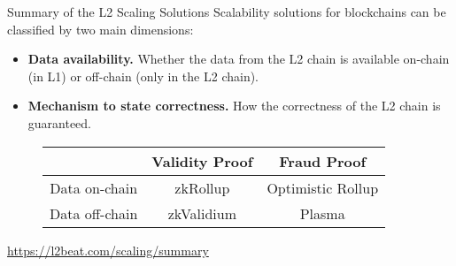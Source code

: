 \begin{frame}[t]{Summary of the L2 Scaling Solutions}
Scalability solutions for blockchains can be classified by two main dimensions:
  \begin{itemize}
  \item \textbf{Data availability.} Whether the data from the L2 chain is available on-chain (in L1) or off-chain (only in the L2 chain).
  \item \textbf{Mechanism to state correctness.} How the correctness of the L2 chain is guaranteed.
  \end{itemize}

\vspace{0.35cm}
\begin{figure}
\begin{tabular}{|c|c|c|}
\hline
\cellcolor{darkgray} & \cellcolor{darkgray} \color{white} Validity Proof  & \cellcolor{darkgray} \color{white} Fraud Proof \\ \hline
\cellcolor{lightgray} Data on-chain   & zkRollup       & Optimistic Rollup \\ \hline
\cellcolor{lightgray} Data off-chain  & zkValidium     & Plasma \\ \hline
\end{tabular}
\end{figure}

\centering
\vspace{0.2cm}
\url{https://l2beat.com/scaling/summary}
\end{frame}





